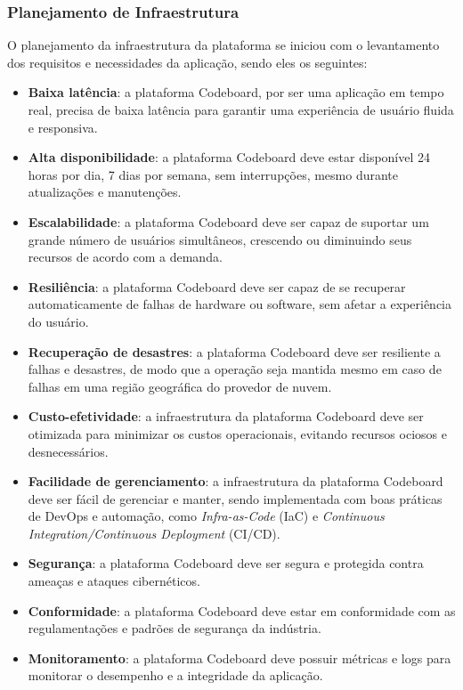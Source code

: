 \subsubsection{Planejamento de Infraestrutura}
O planejamento da infraestrutura da plataforma se iniciou com o levantamento dos requisitos e necessidades da aplicação, sendo eles os seguintes:

\begin{itemize}
    \item \textbf{Baixa latência}: a plataforma Codeboard, por ser uma aplicação em tempo real, precisa de baixa latência para garantir uma experiência de usuário fluida e responsiva.
    \item \textbf{Alta disponibilidade}: a plataforma Codeboard deve estar disponível 24 horas por dia, 7 dias por semana, sem interrupções, mesmo durante atualizações e manutenções.
    \item \textbf{Escalabilidade}: a plataforma Codeboard deve ser capaz de suportar um grande número de usuários simultâneos, crescendo ou diminuindo seus recursos de acordo com a demanda.
    \item \textbf{Resiliência}: a plataforma Codeboard deve ser capaz de se recuperar automaticamente de falhas de hardware ou software, sem afetar a experiência do usuário.
    \item \textbf{Recuperação de desastres}: a plataforma Codeboard deve ser resiliente a falhas e desastres, de modo que a operação seja mantida mesmo em caso de falhas em uma região geográfica do provedor de nuvem.
    \item \textbf{Custo-efetividade}: a infraestrutura da plataforma Codeboard deve ser otimizada para minimizar os custos operacionais, evitando recursos ociosos e desnecessários.
    \item \textbf{Facilidade de gerenciamento}: a infraestrutura da plataforma Codeboard deve ser fácil de gerenciar e manter, sendo implementada com boas práticas de DevOps e automação, como \emph{Infra-as-Code} (IaC) e \emph{Continuous Integration/Continuous Deployment} (CI/CD).
    \item \textbf{Segurança}: a plataforma Codeboard deve ser segura e protegida contra ameaças e ataques cibernéticos.
    \item \textbf{Conformidade}: a plataforma Codeboard deve estar em conformidade com as regulamentações e padrões de segurança da indústria.
    \item \textbf{Monitoramento}: a plataforma Codeboard deve possuir métricas e logs para monitorar o desempenho e a integridade da aplicação. 
\end{itemize}

